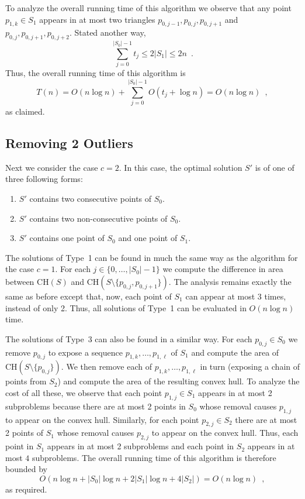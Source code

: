 \documentclass[lotsofwhite]{patmorin}
\newcommand{\ch}{\mathrm{CH}}
\begin{document}
To analyze the overall running time of this algorithm we observe that
any point $p_{1,k}\in S_1$ appears in at most two triangles
$p_{0,j-1},p_{0,j},p_{0,j+1}$ and
$p_{0,j},p_{0,j+1},p_{0,j+2}$.  Stated another way,
\[
     \sum_{j=0}^{|S_0|-1} t_j \le 2|S_1|\le 2n \enspace .
\]
Thus, the overall running time of this algorithm is
\[
     T(n) = O(n\log n)+\sum_{j=0}^{|S_0|-1} O(t_j+\log n) = O(n\log n) \enspace ,
\]
as claimed.

\subsection{Removing 2 Outliers}

Next we consider the case $c=2$.  In this case, the optimal solution
$S'$ is of one of three following forms:

\begin{enumerate}
\item $S'$ contains two consecutive points of $S_0$.
\item $S'$ contains two non-consecutive points of $S_0$.
\item $S'$ contains one point of $S_0$ and one point of $S_1$.
\end{enumerate}

The solutions of Type~1 can be found in much the same way as the
algorithm for the case $c=1$.  For each $j\in\{0,\ldots,|S_0|-1\}$ we
compute the difference in area between $\ch(S)$ and
$\ch(S\setminus\{p_{0,j},p_{0,j+1}\})$.  The analysis remains exactly
the same as before except that, now, each point of $S_1$ can appear at
most $3$ times, instead of only 2.  Thus, all solutions of Type~1 can
be evaluated in $O(n\log n)$ time.

The solutions of Type~3 can also be found in a similar way.  For each
$p_{0,j}\in S_0$ we remove $p_{0,j}$ to expose a sequence
$p_{1,k},\ldots,p_{1,\ell}$ of $S_1$ and compute the area of
$\ch(S\setminus\{p_{0,j}\})$.  We then remove each of
$p_{1,k},\ldots,p_{1,\ell}$ in turn (exposing a chain of points from
$S_2$) and compute the area of the resulting convex hull.  To analyze
the cost of all these, we observe that each point $p_{1,j}\in S_1$
appears in at most 2 subproblems because there are at most 2 points in
$S_0$ whose removal causes $p_{1,j}$ to appear on the convex hull.
Similarly, for each point $p_{2,j}\in S_2$ there are at most 2 points
of $S_1$ whose removal causes $p_{2,j}$ to appear on the convex hull.
Thus, each point in $S_1$ appears in at most 2 subproblems and each
point in $S_2$ appears in at most $4$ subproblems.  The overall
running time of this algorithm is therefore bounded by
\[
    O\left(n\log n + |S_0|\log n + 2|S_1|\log n + 4|S_2|\right) = O(n\log n) \enspace ,
\]
as required.
\end{document}
